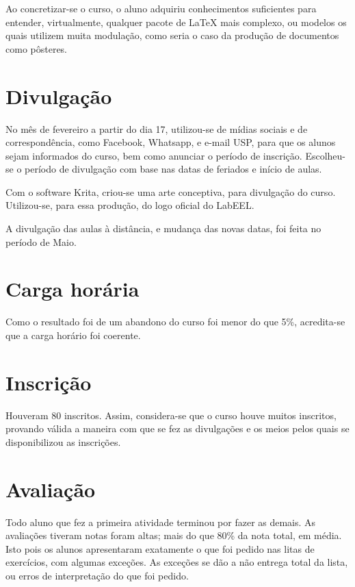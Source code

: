 \documentclass[
12pt,				%
openright,			%
oneside,			%
a4paper,			%
english,			%
french,				%
spanish,			%
brazil,				%
]{abntex2}
\begin{document}
Ao concretizar-se o curso, o aluno adquiriu conhecimentos suficientes para entender, virtualmente, qualquer
pacote de \LaTeX{} mais complexo, ou modelos os quais utilizem muita
modulação, como seria o caso da produção de documentos como pôsteres.




\section{Divulgação}

No mês de fevereiro a partir do dia 17, utilizou-se de mídias sociais e de correspondência, como Facebook,
Whatsapp, e e-mail USP, para que os alunos sejam informados do curso,
bem como anunciar o período de inscrição. Escolheu-se o período de
divulgação com base nas datas de feriados e início de aulas.

Com o software Krita, criou-se uma arte conceptiva, para divulgação do
curso. Utilizou-se, para essa produção, do logo oficial do LabEEL.

A divulgação das aulas à distância, e mudança das  novas datas, foi feita no
período de Maio.

\section{Carga horária}
Como o resultado foi de um abandono do curso foi menor do que 5\%, acredita-se que a carga horário foi coerente.

\section{Inscrição}

Houveram 80 inscritos. Assim, considera-se que o curso houve muitos inscritos, provando válida a maneira com que se fez as divulgações e os meios pelos quais se disponibilizou as inscrições.

\section{Avaliação}
Todo aluno que fez a primeira atividade terminou por fazer as demais. As avaliações tiveram notas foram altas; mais do que 80\% da nota total, em média. Isto pois os alunos apresentaram exatamente o que foi pedido nas litas de exercícios, com algumas exceções. As exceções se dão a não entrega total da lista, ou erros de interpretação do que foi pedido.
\end{document}
